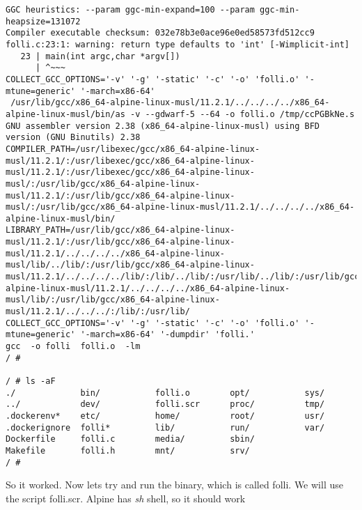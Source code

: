\documentclass{article}  %
\begin{document}
\begin{verbatim}
GGC heuristics: --param ggc-min-expand=100 --param ggc-min-heapsize=131072
Compiler executable checksum: 032e78b3e0ace96e0ed58573fd512cc9
folli.c:23:1: warning: return type defaults to 'int' [-Wimplicit-int]
   23 | main(int argc,char *argv[])
      | ^~~~
COLLECT_GCC_OPTIONS='-v' '-g' '-static' '-c' '-o' 'folli.o' '-mtune=generic' '-march=x86-64'
 /usr/lib/gcc/x86_64-alpine-linux-musl/11.2.1/../../../../x86_64-alpine-linux-musl/bin/as -v --gdwarf-5 --64 -o folli.o /tmp/ccPGBkNe.s
GNU assembler version 2.38 (x86_64-alpine-linux-musl) using BFD version (GNU Binutils) 2.38
COMPILER_PATH=/usr/libexec/gcc/x86_64-alpine-linux-musl/11.2.1/:/usr/libexec/gcc/x86_64-alpine-linux-musl/11.2.1/:/usr/libexec/gcc/x86_64-alpine-linux-musl/:/usr/lib/gcc/x86_64-alpine-linux-musl/11.2.1/:/usr/lib/gcc/x86_64-alpine-linux-musl/:/usr/lib/gcc/x86_64-alpine-linux-musl/11.2.1/../../../../x86_64-alpine-linux-musl/bin/
LIBRARY_PATH=/usr/lib/gcc/x86_64-alpine-linux-musl/11.2.1/:/usr/lib/gcc/x86_64-alpine-linux-musl/11.2.1/../../../../x86_64-alpine-linux-musl/lib/../lib/:/usr/lib/gcc/x86_64-alpine-linux-musl/11.2.1/../../../../lib/:/lib/../lib/:/usr/lib/../lib/:/usr/lib/gcc/x86_64-alpine-linux-musl/11.2.1/../../../../x86_64-alpine-linux-musl/lib/:/usr/lib/gcc/x86_64-alpine-linux-musl/11.2.1/../../../:/lib/:/usr/lib/
COLLECT_GCC_OPTIONS='-v' '-g' '-static' '-c' '-o' 'folli.o' '-mtune=generic' '-march=x86-64' '-dumpdir' 'folli.'
gcc  -o folli  folli.o  -lm   
/ # 

/ # ls -aF
./             bin/           folli.o        opt/           sys/
../            dev/           folli.scr      proc/          tmp/
.dockerenv*    etc/           home/          root/          usr/
.dockerignore  folli*         lib/           run/           var/
Dockerfile     folli.c        media/         sbin/
Makefile       folli.h        mnt/           srv/
/ # 
\end{verbatim}
 So it worked. Now lets try and run the binary, which is called folli. We will use the script folli.scr. Alpine has {\em sh} shell, so it should work
\end{document}
